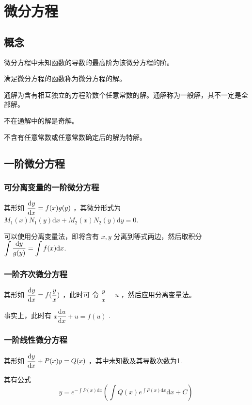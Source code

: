 \chapter{微分方程}

\section{概念}

微分方程中未知函数的导数的最高阶为该微分方程的阶。

满足微分方程的函数称为微分方程的解。

通解为含有相互独立的方程阶数个任意常数的解。通解称为一般解，其不一定是全部解。

不在通解中的解是奇解。

不含有任意常数或任意常数确定后的解为特解。

\section{一阶微分方程}

\subsection{可分离变量的一阶微分方程}

其形如 $ \displaystyle \dfrac{\mathrm{d} y}{\mathrm{d}x} = f(x)g(y) $ ，其微分形式为
$ M_1(x)N_1(y)\mathrm{d}x+M_2(x)N_2(y)\mathrm{d}y = 0 $.

可以使用分离变量法，即将含有 $ x,y $ 分离到等式两边，然后取积分 
$ \displaystyle \int \dfrac{\mathrm{d}y}{g(y)} = \int f(x)\mathrm{d}x $.

\subsection{一阶齐次微分方程}

其形如 $ \displaystyle \dfrac{\mathrm{d}y}{\mathrm{d}x}=f(\dfrac{y}{x}) $ ，此时可
令 $ \dfrac{y}{x} = u $ ，然后应用分离变量法。

事实上，此时有 $ x\dfrac{\mathrm{d}u}{\mathrm{d}x} + u = f(u) $ .

\subsection{一阶线性微分方程}

其形如 $ \displaystyle \dfrac{\mathrm{d}y}{\mathrm{d}x} + P(x)y = Q(x) $ ，其中未知数及其导数次数为1.

其有公式$$
    y = e^{-\int P(x)\mathrm{d}x}
    \left(\int Q(x)e^{\int P(x)\mathrm{d}x}\mathrm{d}x+C\right)
$$ 

